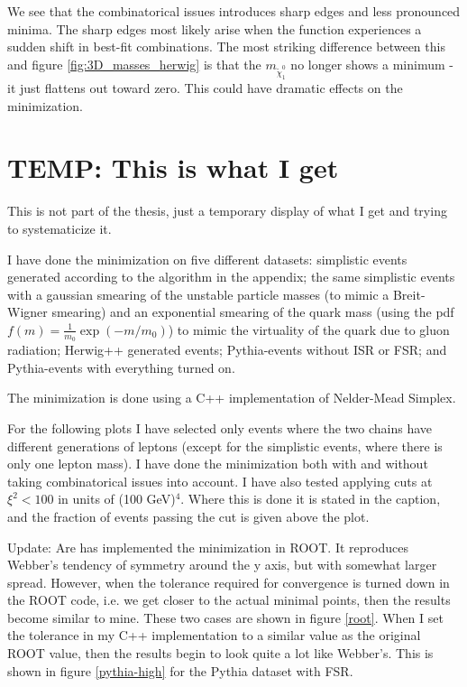 \documentclass[twoside,english]{uiofysmaster}
\begin{document}
We see that the combinatorical issues introduces sharp edges and less pronounced minima. The sharp edges most likely arise when the function experiences a sudden shift in best-fit combinations. The most striking difference between this and figure \ref{fig:3D_masses_herwig} is that the $m_{\tilde \chi_1^0}$ no longer shows a minimum - it just flattens out toward zero. This could have dramatic effects on the minimization. 



\chapter{TEMP: This is what I get}
This is not part of the thesis, just a temporary display of what I get and trying to systematicize it.

I have done the minimization on five different datasets: simplistic events generated according to the algorithm in the appendix; the same simplistic events with a gaussian smearing of the unstable particle masses (to mimic a Breit-Wigner smearing) and an exponential smearing of the quark mass (using the pdf $f(m) = \frac{1}{m_0}\exp(-m/m_0)$) to mimic the virtuality of the quark due to gluon radiation; Herwig++ generated events; Pythia-events without ISR or FSR; and Pythia-events with everything turned on.

The minimization is done using a C++ implementation of Nelder-Mead Simplex. 

For the following plots I have selected only events where the two chains have different generations of leptons (except for the simplistic events, where there is only one lepton mass). I have done the minimization both with and without taking combinatorical issues into account. I have also tested applying cuts at $\xi^2 < 100$ in units of (100 GeV)$^4$. Where this is done it is stated in the caption, and the fraction of events passing the cut is given above the plot.

Update: Are has implemented the minimization in ROOT. It reproduces Webber's tendency of symmetry around the y axis, but with somewhat larger spread. However, when the tolerance required for convergence is turned down in the ROOT code, i.e. we get closer to the actual minimal points, then the results become similar to mine. These two cases are shown in figure \ref{root}. When I set the tolerance in my C++ implementation to a similar value as the original ROOT value, then the results begin to look quite a lot like Webber's. This is shown in figure \ref{pythia-high} for the Pythia dataset with FSR.
\end{document}
